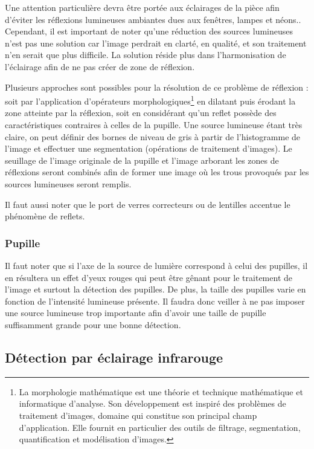 Une attention particulière devra être portée aux éclairages de la pièce afin d'éviter les réflexions lumineuses ambiantes dues aux fenêtres, lampes et néons.. Cependant, il est important de noter qu’une réduction des sources lumineuses n’est pas une solution car l’image perdrait en clarté, en qualité, et son traitement n’en serait que plus difficile. La solution réside plus dans l’harmonisation de l’éclairage afin de ne pas créer de zone de réflexion.

Plusieurs approches sont possibles pour la résolution de ce problème de réflexion : soit par l’application d’opérateurs morphologiques\footnote{La morphologie mathématique est une théorie et technique mathématique et informatique d'analyse. Son développement est inspiré des problèmes de traitement d'images, domaine qui constitue son principal champ d'application. Elle fournit en particulier des outils de filtrage, segmentation, quantification et modélisation d'images.} en dilatant puis érodant la zone atteinte par la réflexion, soit en considérant qu’un reflet possède des caractéristiques contraires à celles de la pupille. Une source lumineuse étant très claire, on peut définir des bornes de niveau de gris à partir de l’histogramme de l’image et effectuer une segmentation (opérations de traitement d’images). Le seuillage de l’image originale de la pupille et l’image arborant les zones de réflexions seront combinés afin de former une image où les trous provoqués par les sources lumineuses seront remplis.

Il faut aussi noter que le port de verres correcteurs ou de lentilles accentue le phénomène de reflets.

\subsubsection{Pupille}

Il faut noter que si l’axe de la source de lumière correspond à celui des pupilles, il en résultera un effet d’yeux rouges qui peut être gênant pour le traitement de l’image et surtout la détection des pupilles. De plus, la taille des pupilles varie en fonction de l’intensité lumineuse présente. Il faudra donc veiller à ne pas imposer une source lumineuse trop importante afin d’avoir une taille de pupille suffisamment grande pour une bonne détection.

\subsection{Détection par éclairage infrarouge}
\label{EclInfra}

